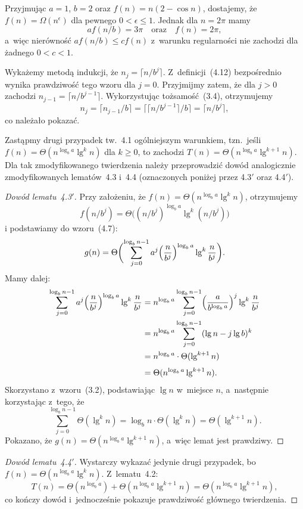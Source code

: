 \exercise %
Przyjmując $a=1$, $b=2$ oraz $f(n)=n(2-\cos n)$, dostajemy, że $f(n)=\Omega(n^\epsilon)$ dla pewnego $0<\epsilon\le1$. Jednak dla $n=2\pi$ mamy
\[
	af(n/b) = 3\pi \quad\text{oraz}\quad f(n) = 2\pi,
\]
a~więc nierówność $af(n/b)\le cf(n)$ z~warunku regularności nie zachodzi dla żadnego $0<c<1$.


\exercise %
Wykażemy metodą indukcji, że $n_j=\bigl\lceil n/b^j\bigr\rceil$. Z~definicji~(4.12) bezpośrednio wynika prawdziwość tego wzoru dla $j=0$. Przyjmijmy zatem, że dla $j>0$ zachodzi $n_{j-1}=\bigl\lceil n/b^{j-1}\bigr\rceil$. Wykorzystując tożsamość~(3.4), otrzymujemy
\[
	n_j = \lceil n_{j-1}/b\rceil = \bigl\lceil\bigl\lceil n/b^{j-1}\bigr\rceil/b\bigr\rceil = \bigl\lceil n/b^j\bigr\rceil,
\]
co należało pokazać.

\exercise %
Zastąpmy drugi przypadek tw.~4.1 ogólniejszym warunkiem, tzn.\ jeśli $f(n)=\Theta(n^{\log_ba}\lg^kn)$ dla $k\ge0$, to zachodzi $T(n)=\Theta(n^{\log_ba}\lg^{k+1}n)$. Dla tak zmodyfikowanego twierdzenia należy przeprowadzić dowód analogicznie zmodyfikowanych lematów~4.3 i~4.4 (oznaczonych poniżej przez 4.3$'$ oraz 4.4$'$).

\begin{proof}[Dowód lematu~4.3\/$'$]
	Przy założeniu, że $f(n)=\Theta(n^{\log_ba}\lg^kn)$, otrzymujemy
	\[
		f(n/b^j)=\Theta\bigl((n/b^j)^{\log_ba}\lg^k(n/b^j)\bigr)
	\]
	i podstawiamy do wzoru~(4.7):
	\[
		g(n) = \Theta\biggl(\sum_{j=0}^{\log_bn-1}a^j\Bigl(\frac{n}{b^j}\Bigr)^{\log_ba}\lg^k\frac{n}{b^j}\biggr).
	\]
	Mamy dalej:
	\begin{align*}
		\sum_{j=0}^{\log_bn-1}a^j\Bigl(\frac{n}{b^j}\Bigr)^{\log_ba}\lg^k\frac{n}{b^j} &= n^{\log_ba}\sum_{j=0}^{\log_bn-1}\Bigl(\frac{a}{b^{\log_ba}}\Bigr)^j\lg^k\frac{n}{b^j} \\
		&= n^{\log_ba}\sum_{j=0}^{\log_bn-1}(\lg n-j\lg b)^k \\
		&= n^{\log_ba}\cdot\Theta(\lg^{k+1}n) \\[1mm]
		&= \Theta(n^{\log_ba}\lg^{k+1}n).
	\end{align*}
	Skorzystano z~wzoru~(3.2), podstawiając $\lg n$ w~miejsce $n$, a~następnie korzystając z~tego, że
	\[
		\sum_{j=0}^{\log_bn-1}\Theta(\lg^kn) = \log_bn\cdot\Theta(\lg^kn) = \Theta(\lg^{k+1}n).
	\]
	Pokazano, że $g(n)=\Theta(n^{\log_ba}\lg^{k+1}n)$, a~więc lemat jest prawdziwy.
\end{proof}

\begin{proof}[Dowód lematu~4.4\/$'$]
	Wystarczy wykazać jedynie drugi przypadek, bo $f(n)=\Theta(n^{\log_ba}\lg^kn)$. Z~lematu~4.2:
	\[
		T(n) = \Theta(n^{\log_ba})+\Theta(n^{\log_ba}\lg^{k+1}n) = \Theta(n^{\log_ba}\lg^{k+1}n),
	\]
	co kończy dowód i~jednocześnie pokazuje prawdziwość głównego twierdzenia.
\end{proof}

